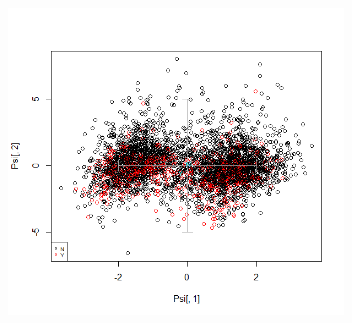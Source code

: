 \begin{center}
\includegraphics[width=3.5in]{images/ACP/2-3iteration/match-2-3.png}
\label{fig:match23}
\end{center}

